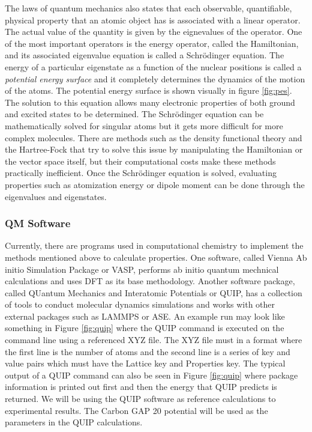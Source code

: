 \documentclass[12pt, abstract = true]{scrartcl}
\begin{document}
The laws of quantum mechanics also states that each observable, quantifiable, physical property that 
an atomic object has is associated with a linear operator. The actual value of the quantity is given 
by the eignevalues of the operator. One of the most important operators is the energy operator, called 
the Hamiltonian, and its associated eigenvalue equation is called a Schrödinger equation. The energy of 
a particular eigenstate as a function of the nuclear positions is called a \emph{potential energy surface}
and it completely determines the dynamics of the motion of the atoms. The potential energy surface is shown visually in figure \ref{fig:pes}. The solution to this equation  allows many electronic properties of both 
ground and excited states to be determined. The Schrödinger equation can be mathematically solved for 
singular atoms but it gets more difficult for more complex molecules. There are methods such as the density 
functional theory and the Hartree-Fock that try to solve this issue by manipulating the Hamiltonian or the vector space itself, but their computational costs make these methods practically inefficient. Once the Schrödinger 
equation is solved, evaluating properties such as atomization energy or dipole moment can be done 
through the eigenvalues and eigenstates.

\subsubsection{QM Software} 

Currently, there are programs used in computational chemistry to implement the methods mentioned above to 
calculate properties. One software, called Vienna Ab initio Simulation Package or VASP, performs ab initio 
quantum mechnical calculations and uses DFT as its base methodology. Another software package, called 
QUantum Mechanics and Interatomic Potentials or QUIP\cite{quip}, has a collection of tools to conduct 
molecular dynamics simulations and works with other external packages such as LAMMPS or ASE. An example run may look like something in Figure \ref{fig:quip} where the QUIP command is executed on the command line using a referenced XYZ file. The XYZ file must in a format where the first line is the number of atoms and the second line is a series of key and value pairs which must have the Lattice key and Properties key. The typical output of a QUIP command can also be seen in Figure \ref{fig:quip} where package information is printed out first and then the energy that QUIP predicts is returned. We will be using the QUIP software as reference calculations to experimental results. 
The Carbon GAP 20 potential\cite{gap20} will be used as the parameters in the QUIP calculations.
\end{document}
